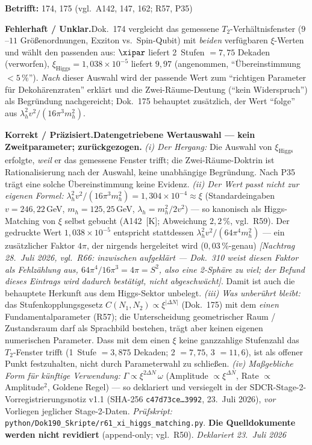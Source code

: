 \noindent\textbf{Betrifft:} 174, 175 (vgl.\ A142, 147, 162; R57, P35)


\smallskip\noindent\textbf{Fehlerhaft / Unklar.}\quad Dok.~174 vergleicht das gemessene $T_2$-Verhältnisfenster ($9$--$11$ Größenordnungen, Exziton vs.\ Spin-Qubit) mit \emph{beiden} verfügbaren $\xi$-Werten und wählt den passenden aus: $\xipar$ liefert 2~Stufen $=7{,}75$ Dekaden (verworfen), $\xi_\text{Higgs}=1{,}038\times10^{-5}$ liefert $9{,}97$ (angenommen, \enquote{Übereinstimmung $<5\,\%$}). \emph{Nach} dieser Auswahl wird der passende Wert zum \enquote{richtigen Parameter für Dekohärenzraten} erklärt und die Zwei-Räume-Deutung (\enquote{kein Widerspruch}) als Begründung nachgereicht; Dok.~175 behauptet zusätzlich, der Wert \enquote{folge} aus $\lambda_h^2 v^2/(16\pi^3 m_h^2)$.


\smallskip\noindent\textbf{Korrekt / Präzisiert.}\quad \textbf{Datengetriebene Wertauswahl --- kein Zweitparameter; zurückgezogen.} \emph{(i) Der Hergang:} Die Auswahl von $\xi_\text{Higgs}$ erfolgte, \emph{weil} er das gemessene Fenster trifft; die Zwei-Räume-Doktrin ist Rationalisierung nach der Auswahl, keine unabhängige Begründung. Nach P35 trägt eine solche Übereinstimmung keine Evidenz. \emph{(ii) Der Wert passt nicht zur eigenen Formel:} $\lambda_h^2 v^2/(16\pi^3 m_h^2)=1{,}304\times10^{-4}\approx\xi$ (Standardeingaben $v=246{,}22$\,GeV, $m_h=125{,}25$\,GeV, $\lambda_h=m_h^2/2v^2$) --- so kanonisch als Higgs-Matching von $\xi$ selbst gebucht (A142~[K]; Abweichung $2{,}2\,\%$, vgl.\ R59). Der gedruckte Wert $1{,}038\times10^{-5}$ entspricht stattdessen $\lambda_h^2 v^2/(64\pi^4 m_h^2)$ --- ein zusätzlicher Faktor $4\pi$, der nirgends hergeleitet wird ($0{,}03\,\%$-genau) \emph{[Nachtrag 28.~Juli 2026, vgl.\ R66: inzwischen aufgeklärt --- Dok.~310 weist diesen Faktor als Fehlzählung aus, $64\pi^4/16\pi^3 = 4\pi = S^2$, also eine 2-Sphäre zu viel; der Befund dieses Eintrags wird dadurch bestätigt, nicht abgeschwächt]}. Damit ist auch die behauptete Herkunft aus dem Higgs-Sektor unbelegt. \emph{(iii) Was unberührt bleibt:} das Stufenkopplungsgesetz $C(N_1,N_2)\propto\xi^{|\Delta N|}$ (Dok.~175) mit dem \emph{einen} Fundamentalparameter (R57); die Unterscheidung geometrischer Raum / Zustandsraum darf als Sprachbild bestehen, trägt aber keinen eigenen numerischen Parameter. Dass mit dem einen $\xi$ keine ganzzahlige Stufenzahl das $T_2$-Fenster trifft (1~Stufe $=3{,}875$ Dekaden; 2 $=7{,}75$, 3 $=11{,}6$), ist als offener Punkt festzuhalten, nicht durch Parameterwahl zu schließen. \emph{(iv) Maßgebliche Form für künftige Verwendung:} $\Gamma \propto \xi^{2\Delta N}\,\omega$ (Amplitude $\propto \xi^{\Delta N}$, Rate $\propto$ Amplitude$^2$, Goldene Regel) --- so deklariert und versiegelt in der SDCR-Stage-2-Vorregistrierungsnotiz v1.1 (SHA-256 \texttt{c47d73ce\ldots{}3992}, 23.~Juli 2026), \emph{vor} Vorliegen jeglicher Stage-2-Daten. \emph{Prüfskript:} \texttt{python/Dok190\_Skripte/r61\_xi\_higgs\_matching.py}. \textbf{Die Quelldokumente werden nicht revidiert} (append-only; vgl.\ R50). \emph{Deklariert 23.~Juli 2026}


